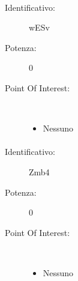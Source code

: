 \documentclass[../SperimentazioniPratiche.tex]{subfiles}
\begin{document}
			\paragraph*{}
			\label{01005}
			\begin{tcolorbox}[fonttitle=\bfseries, 
								adjusted title={\Large Beacon 01005},
								sharp corners=south,
								colback=white, 
								colframe=white!50!blue!75!black]
								
				\begin{description}
					\item[Identificativo:] wESv
					\item[Potenza:] 0

					\tcbline					
					
					\item[Point Of Interest:] \ \par
					\begin{itemize}
						\item Nessuno
					\end{itemize}					   				
				\end{description}  				
			\end{tcolorbox}
			
			\paragraph*{}
			\label{01006}
			\begin{tcolorbox}[fonttitle=\bfseries, 
								adjusted title={\Large Beacon 01006},
								sharp corners=south,
								colback=white, 
								colframe=white!50!blue!75!black]
								
				\begin{description}
					\item[Identificativo:] Zmb4
					\item[Potenza:] 0

					\tcbline					
					
					\item[Point Of Interest:] \ \par
					\begin{itemize}
						\item Nessuno
					\end{itemize}					   				
				\end{description}  				
			\end{tcolorbox}
			
\end{document}
